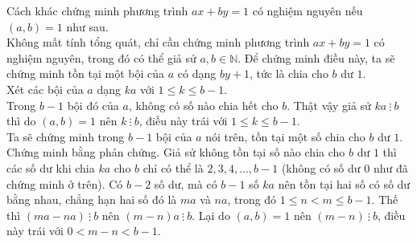 \begin{bt}
\begin{note}
Cách khác chứng minh phương trình $ax+by=1$ có nghiệm nguyên nếu $(a,b)=1$ như sau.\\
Không mất tính tổng quát, chỉ cần chứng minh phương trình $ax+by=1$ có nghiệm nguyên, trong đó có thể giả sử $a, b\in \mathbb{N}$. Để chứng minh điều này, ta sẽ chứng minh tồn tại một bội của $a$ có dạng $by+1$, tức là chia cho $b$ dư $1$.\\
Xét các bội của $a$ dạng $ka$ với $1 \le k \le b-1$.\\
Trong $b-1$ bội đó của $a$, không có số nào chia hết cho $b$. Thật vậy giả sử $ka ~\vdots~ b$ thì do $(a,b)=1$ nên $k ~\vdots~ b$, điều này trái với $1 \le k \le b-1$.\\
Ta sẽ chứng minh trong $b-1$ bội của $a$ nói trên, tồn tại một số chia cho $b$ dư $1$.\\
Chứng minh bằng phản chứng. Giả sử không tồn tại số nào chia cho $b$ dư $1$ thì các số dư khi chia $ka$ cho $b$ chỉ có thể là $2, 3, 4, \ldots, b-1$ (không có số dư $0$ như đã chứng minh ở trên). Có $b-2$ số dư, mà có $b-1$ số $ka$ nên tồn tại hai số có số dư bằng nhau, chẳng hạn hai số đó là $ma$ và $na$, trong đó $1 \le n<m \le b-1$. Thế thì $(ma-na)~\vdots~ b$ nên $(m-n)a ~\vdots~ b$. Lại do $(a,b)=1$ nên $(m-n)~\vdots~ b$, điều này trái với $0<m-n<b-1$.
\end{note}
\end{bt}